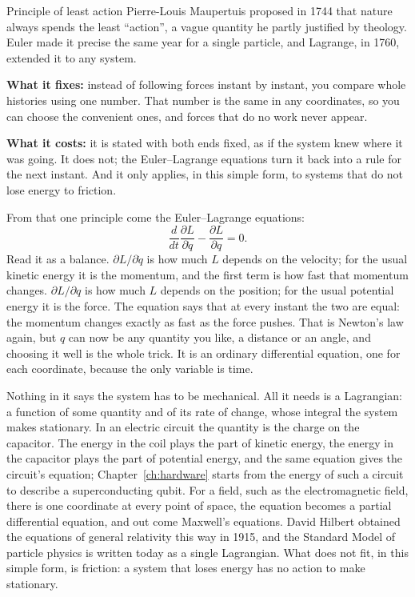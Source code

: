 \begin{concept}{Principle of least action}
Pierre-Louis Maupertuis proposed in 1744 that nature always spends the least
``action'', a vague quantity he partly justified by theology. Euler made it precise the
same year for a single particle, and Lagrange, in 1760, extended it to any system.

\textbf{What it fixes:} instead of following forces instant by instant, you compare whole
histories using one number. That number is the same in any coordinates, so you can
choose the convenient ones, and forces that do no work never appear.

\textbf{What it costs:} it is stated with both ends fixed, as if the system knew where it
was going. It does not; the Euler--Lagrange equations turn it back into a rule for the
next instant. And it only applies, in this simple form, to systems that do not lose
energy to friction.
\end{concept}

From that one principle come the Euler--Lagrange equations:
\[
  \frac{d}{dt}\frac{\partial L}{\partial \dot{q}} - \frac{\partial L}{\partial q} = 0 .
\]
Read it as a balance. $\partial L/\partial\dot q$ is how much $L$ depends on the
velocity; for the usual kinetic energy it is the momentum, and the first term is how
fast that momentum changes. $\partial L/\partial q$ is how much $L$ depends on the
position; for the usual potential energy it is the force. The equation says that at
every instant the two are equal: the momentum changes exactly as fast as the force
pushes. That is Newton's law again, but $q$ can now be any quantity you like, a
distance or an angle, and choosing it well is the whole trick. It is an ordinary
differential equation, one for each coordinate, because the only variable is time.

Nothing in it says the system has to be mechanical. All it needs is a Lagrangian: a
function of some quantity and of its rate of change, whose integral the system makes
stationary. In an electric circuit the quantity is the charge on the capacitor. The
energy in the coil plays the part of kinetic energy, the energy in the capacitor
plays the part of potential energy, and the same equation gives the circuit's
equation; Chapter~\ref{ch:hardware} starts from the energy of such a circuit to
describe a superconducting qubit. For a field, such as the electromagnetic field,
there is one coordinate at every point of space, the equation becomes a partial
differential equation, and out come Maxwell's equations. David Hilbert obtained the
equations of general relativity this way in 1915, and the Standard Model of particle
physics is written today as a single Lagrangian. What does not fit, in this simple
form, is friction: a system that loses energy has no action to make stationary.

